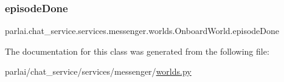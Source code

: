 \subsubsection{\texorpdfstring{episode\+Done}{episodeDone}}
{\footnotesize\ttfamily parlai.\+chat\+\_\+service.\+services.\+messenger.\+worlds.\+Onboard\+World.\+episode\+Done}



The documentation for this class was generated from the following file\+:\begin{DoxyCompactItemize}
\item 
parlai/chat\+\_\+service/services/messenger/\hyperlink{parlai_2chat__service_2services_2messenger_2worlds_8py}{worlds.\+py}\end{DoxyCompactItemize}
